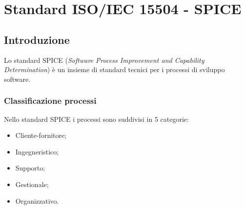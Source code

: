 \section{Standard ISO/IEC 15504 - SPICE}
\subsection{Introduzione}
Lo standard SPICE (\textit{Software Process Improvement and Capability Determination}) è un insieme di standard tecnici per i processi di sviluppo software.

\subsubsection{Classificazione processi}
Nello standard SPICE i processi sono suddivisi in 5 categorie:
\begin{itemize}
  \item Cliente-fornitore;
  \item Ingegneristico;
  \item Supporto;
  \item Gestionale;
  \item Organizzativo.
\end{itemize}

